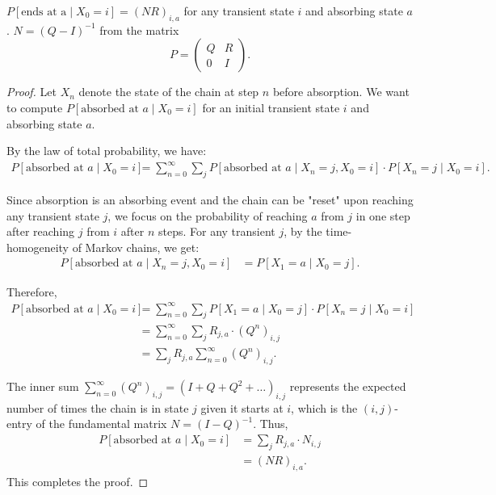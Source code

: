\documentclass[a4paper]{article}
\begin{document}
\begin{theorem}
  $P[\text{ends at a} \mid X_0  = i] = \left( NR \right)_{i,a}  $ for any transient state $i$ and absorbing state  $a$. $N = (Q-I)^{-1}$ from the matrix    
  \[
     P = \begin{pmatrix} Q & R \\ 0 & I \end{pmatrix}
   .\]  

\noindent\hrulefill

\begin{proof}
   Let \( X_n \) denote the state of the chain at step \( n \) before absorption. We want to compute \( P[\text{absorbed at } a \mid X_0 = i] \) for an initial transient state \( i \) and absorbing state \( a \).

   By the law of total probability, we have:
   \begin{align*}
       P[\text{absorbed at } a \mid X_0 = i] &= \sum_{n=0}^{\infty} \sum_{j} P[\text{absorbed at } a \mid X_n = j, X_0 = i] \cdot P[X_n = j \mid X_0 = i].
   \end{align*}

   Since absorption is an absorbing event and the chain can be "reset" upon reaching any transient state \( j \), we focus on the probability of reaching \( a \) from \( j \) in one step after reaching \( j \) from \( i \) after \( n \) steps. For any transient \( j \), by the time-homogeneity of Markov chains, we get:
   \begin{align*}
       P[\text{absorbed at } a \mid X_n = j, X_0 = i] &= P[X_1 = a \mid X_0 = j].
   \end{align*}

   Therefore,
   \begin{align*}
       P[\text{absorbed at } a \mid X_0 = i] &= \sum_{n=0}^{\infty} \sum_{j} P[X_1 = a \mid X_0 = j] \cdot P[X_n = j \mid X_0 = i] \\
       &= \sum_{n=0}^{\infty} \sum_{j} R_{j,a} \cdot (Q^n)_{i,j} \\
       &= \sum_{j} R_{j,a} \sum_{n=0}^{\infty} (Q^n)_{i,j}.
   \end{align*}

   The inner sum \( \sum_{n=0}^{\infty} (Q^n)_{i,j} = (I + Q + Q^{2} + \ldots)_{i,j} \) represents the expected number of times the chain is in state \( j \) given it starts at \( i \), which is the \( (i,j) \)-entry of the fundamental matrix \( N = (I - Q)^{-1} \). Thus,
   \begin{align*}
       P[\text{absorbed at } a \mid X_0 = i] &= \sum_{j} R_{j,a} \cdot N_{i,j} \\
       &= (NR)_{i,a}.
   \end{align*}
   This completes the proof.
\end{proof}

 \end{theorem}
\end{document}
